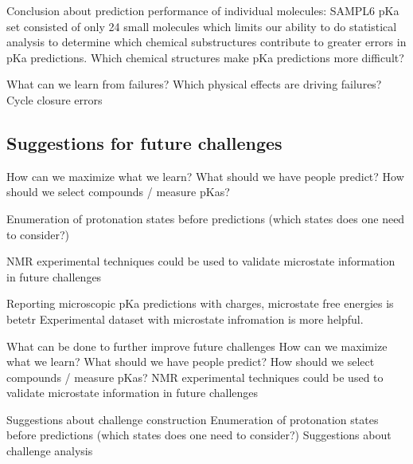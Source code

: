 \documentclass[9pt,lineno,final]{elife}
\begin{document}
Conclusion about prediction performance of individual molecules:
SAMPL6 pKa set consisted of only 24 small molecules which limits our ability to do statistical analysis to determine which chemical substructures contribute to greater errors in pKa predictions.  
Which chemical structures make pKa predictions more difficult?  

What can we learn from failures? Which physical effects are driving failures?
Cycle closure errors


\subsection{Suggestions for future challenges}

How can we maximize what we learn?
What should we have people predict?
How should we select compounds / measure pKas?


Enumeration of protonation states before predictions (which states does one need to consider?)


NMR experimental techniques could be used to validate microstate information in future challenges

Reporting microscopic pKa predictions with charges, microstate free energies is betetr
Experimental dataset with microstate infromation is more helpful.

What can be done to further improve future challenges
How can we maximize what we learn?
What should we have people predict?
How should we select compounds / measure pKas? NMR experimental techniques could be used to validate microstate information in future challenges

Suggestions about challenge construction
Enumeration of protonation states before predictions (which states does one need to consider?)
Suggestions about challenge analysis
















\end{document}
